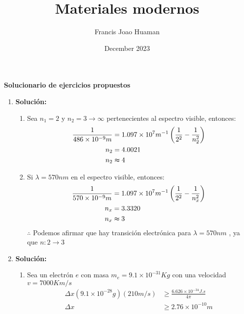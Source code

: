 \documentclass{article}
\title{Materiales modernos}
\author{Francis Joao Huaman}
\date{December 2023}
\begin{document}



\begin{center}
    {\large \textbf{Solucionario de ejercicios propuestos}}
\end{center}


\begin{enumerate}
    \item 
    \textbf{Solución:}
    \begin{enumerate}
        \item 
        Sea $n_1 = 2$ y $n_2 = 3 \rightarrow \infty$ pertenecientes al espectro visible, entonces:
        \begin{equation*}
        \begin{split}
            \frac{1}{486 \times 10^{-9}m } &= 1.097 \times 10^{7}m^{-1} \left(\frac{1}{2^{2}} - \frac{1}{n_2^{2}}\right) \\
                n_2 &= 4.0021\\
                n_2 &\thickapprox 4 \\
        \end{split}
        \end{equation*}

        \item 
        Si $\lambda = 570nm$ en el espectro visible, entonces:
        \begin{equation*}
            \begin{split}
                \frac{1}{570 \times 10^{-9}m } &= 1.097 \times 10^{7}m^{-1} \left(\frac{1}{2^{2}} - \frac{1}{n_x^{2}}\right) \\
                n_x &= 3.3320\\
                n_x &\thickapprox 3 \\
            \end{split}
        \end{equation*}
        $\therefore$ Podemos afirmar que hay transici\'on electr\'onica para $\lambda = 570nm$ , ya que $n: 2 \rightarrow 3$
    \end{enumerate}


    \item 
    \textbf{Solución:}
    \begin{enumerate}
        \item 
        Sea un electr\'on $e$ con masa $m_e = 9.1 \times 10^{-31}Kg$ con una velocidad $v = 7000Km/s$ 
        \begin{equation*}
            \begin{split}
                \Delta x (9.1 \times 10^{-28}g) (210m/s) &\geqslant \frac{6.626 \times 10^{-34}J.s}{4\pi}\\
                \Delta x &\geqslant 2.76 \times 10^{-10}m
            \end{split}
        \end{equation*}    


\end{enumerate}
\end{enumerate}
\end{document}
